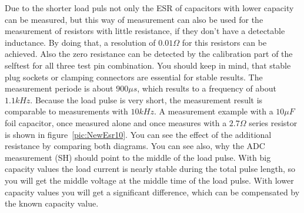Due to the shorter load puls not only the ESR of capacitors with lower capacity can be measured, but this
way of measurement can also be used for the measurement of resistors with little resistance, if they don't
have a detectable inductance. By doing that, a resolution of \(0.01 \Omega\) for this resistors can be achieved.
Also the zero resistance can be detected by the calibration part of the selftest for all three test pin combination.
You should keep in mind, that stable plug sockets or clamping connectors are essential for stable results.
The measurement periode is about \(900 \mu s\), which results to a frequency of about \(1.1 kHz\).
Because the load pulse is very short, the measurement result is comparable to measurements with \(10 kHz\).
A measurement example with a \(10 \mu F\) foil capacitor, once measured alone and once measures with a \(2.7 \Omega\)
series resistor is shown in figure~\ref{pic:NewEsr10}.
You can see the effect of the additional resistance by comparing both diagrams.
You can see also, why the ADC measurement (SH) should point to the middle of the load pulse.
With big capacity values the load current is nearly stable during the total pulse length,
so you will get the middle voltage at the middle time of the load pulse. 
With lower capacity values you will get a significant difference, which can be compensated by the
known capacity value.

